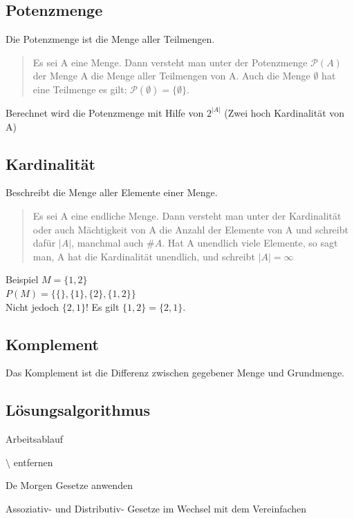 \documentclass[german]{latex4ei/latex4ei_sheet}
\begin{document}
\begin{sectionbox}
	
\subsection{Potenzmenge}
	Die Potenzmenge ist die Menge aller Teilmengen.
	\begin{quote}
	Es sei A eine Menge. Dann versteht man unter der Potenzmenge $\mathcal{P}(A)$ der Menge A die Menge aller Teilmengen von A. Auch die Menge $\emptyset$ hat eine Teilmenge es gilt: $\mathcal{P}(\emptyset) = \lbrace \emptyset \rbrace$.
	\end{quote}
	
	Berechnet wird die Potenzmenge mit Hilfe von $2^{\vert A \vert}$ (Zwei hoch Kardinalität von A)

\subsection{Kardinalität}
	Beschreibt die Menge aller Elemente einer Menge.
	
	\begin{quote}
	Es sei A eine endliche Menge. Dann versteht man unter der Kardinalität oder auch Mächtigkeit von A die Anzahl der Elemente von A und schreibt dafür $\vert A \vert$, manchmal auch $\#A$. Hat A unendlich viele Elemente, so sagt man, A hat die Kardinalität unendlich, und schreibt $\vert A \vert = \infty$
	\end{quote}
	
	\begin{cookbox}{Beispiel}
		$M = \lbrace 1, 2\rbrace$ \\
		$P\left(M \right) = \lbrace \lbrace \rbrace, \lbrace 1 \rbrace, \lbrace 2 \rbrace, \lbrace 1, 2 \rbrace \rbrace $ \\
		Nicht jedoch $\lbrace 2,1 \rbrace$! Es gilt $\lbrace 1,2 \rbrace = \lbrace 2,1 \rbrace$.

	\end{cookbox}

\subsection{Komplement}
	Das Komplement ist die Differenz zwischen gegebener Menge und Grundmenge. 
	
\subsection{Lösungsalgorithmus}
\begin{cookbox}{Arbeitsablauf}
		\item $\setminus$ entfernen
		\item De Morgen Gesetze anwenden
		\item Assoziativ- und Distributiv- Gesetze im Wechsel mit dem Vereinfachen
	\end{cookbox}


\end{sectionbox}
\end{document}
